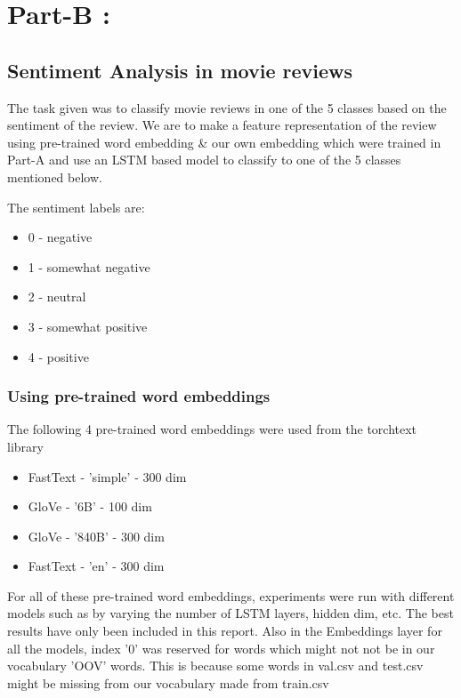 \documentclass{article}
\begin{document}
\section{Part-B : }
\subsection*{Sentiment Analysis in movie reviews}

The task given was to classify movie reviews in one of the 5 classes based on the sentiment of the review.  We are to make a feature representation of the review using pre-trained word embedding \& our own embedding which were trained in  Part-A and use an LSTM based model to classify to one of the 5 classes mentioned below.  

The sentiment labels are:
\begin{itemize}[noitemsep]
    \item 0 - negative 
    \item 1 - somewhat negative
    \item 2 - neutral 
    \item 3 - somewhat positive
    \item 4 - positive
\end{itemize}
 
\subsubsection*{Using pre-trained word embeddings}

The following 4 pre-trained word embeddings were used from the torchtext library
\begin{itemize}[noitemsep]
    \item FastText - 'simple' - 300 dim
    \item GloVe - '6B' - 100 dim
    \item GloVe - '840B' - 300 dim
    \item FastText - 'en' - 300 dim
\end{itemize}    

\noindent
For all of these pre-trained word embeddings, experiments were run with different models such as by varying the number of LSTM layers, hidden dim, etc. The best results have only been included in this report. Also in the Embeddings layer for all the models, index '0' was reserved for words which might not not be in our vocabulary 'OOV' words. This is because some words in val.csv and test.csv might be missing from our vocabulary made from train.csv
\\
\end{document}
